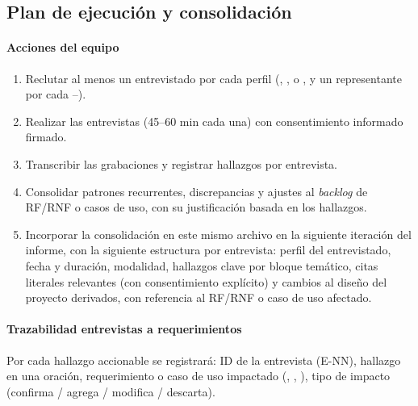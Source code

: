 \subsection{Plan de ejecución y consolidación}

\paragraph{Acciones del equipo}
\begin{enumerate}
  \item Reclutar al menos un entrevistado por cada perfil
        (, ,  o , y un representante por cada
        --).
  \item Realizar las entrevistas (45--60 min cada una) con
        consentimiento informado firmado.
  \item Transcribir las grabaciones y registrar hallazgos por
        entrevista.
  \item Consolidar patrones recurrentes, discrepancias y ajustes al
        \textit{backlog} de RF/RNF o casos de uso, con su justificación
        basada en los hallazgos.
  \item Incorporar la consolidación en este mismo archivo en la
        siguiente iteración del informe, con la siguiente estructura
        por entrevista: perfil del entrevistado, fecha y duración,
        modalidad, hallazgos clave por bloque temático, citas
        literales relevantes (con consentimiento explícito) y cambios
        al diseño del proyecto derivados, con referencia al RF/RNF o
        caso de uso afectado.
\end{enumerate}

\paragraph{Trazabilidad entrevistas a requerimientos} Por cada
hallazgo accionable se registrará: ID de la entrevista (E-NN),
hallazgo en una oración, requerimiento o caso de uso impactado
(, , ), tipo de impacto
(confirma / agrega / modifica / descarta).
